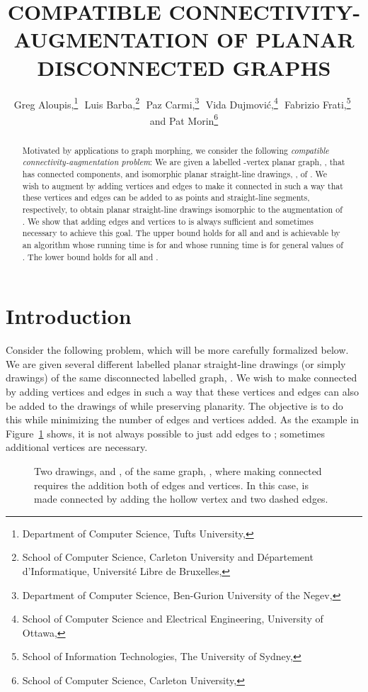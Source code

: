\documentclass[11pt]{patmorin}
\title{\MakeUppercase{Compatible Connectivity-Augmentation \newline of Planar Disconnected Graphs}}
\author{Greg Aloupis,\thanks{Department of Computer Science, Tufts University, 
                             \email{aloupis.greg@gmail.com}}\,\,
       Luis Barba,\thanks{School of Computer Science, Carleton University
                          and Département d'Informatique, 
                          Université Libre de Bruxelles,
                          \email{lbarbafl@ulb.ac.be}}\,\,
       Paz Carmi,\thanks{Department of Computer Science,
                         Ben-Gurion University of the Negev,
                         \email{carmip@cs.bgu.ac.il}}\,\,
       Vida Dujmović,\thanks{School of Computer Science 
                             and Electrical Engineering,
                             University of Ottawa,
                             \email{vida.dujmovic@uottawa.ca}}\,\,
       Fabrizio Frati,\thanks{School of Information Technologies,
                              The University of Sydney,
                              \email{fabrizio.frati@sydney.edu.au}}\,\,
       and Pat Morin\thanks{School of Computer Science, Carleton University,
                            \email{morin@scs.carleton.ca}}}
\begin{document}
\begin{titlepage}

\maketitle
\begin{abstract}
Motivated by applications to graph morphing, we consider the following
\emph{compatible connectivity-augmentation problem}: We are given
a labelled -vertex planar graph, , that has 
connected components, and  isomorphic planar straight-line drawings,
, of . We wish to augment 
by adding  vertices and edges to make it connected in such a way that
these vertices and edges can be added to  as points and
straight-line segments, respectively, to obtain  planar straight-line
drawings isomorphic to the augmentation of .  We show
that adding  edges and vertices to 
is always sufficient and sometimes necessary to achieve this goal.
The upper bound holds for all  and  and is
achievable by an algorithm whose running time is  for
 and whose running time is  for general values of .
The lower bound holds for all  and .
\end{abstract}

\end{titlepage}



\section{Introduction}


Consider the following problem, which will be more carefully formalized
below.  We are given several different labelled planar straight-line drawings
(or simply drawings) of the same disconnected labelled graph, .
We wish to make  connected by adding vertices and edges in
such a way that these vertices and edges can also be added to the 
drawings of  while preserving planarity.  
The objective is to do this while minimizing the number
of edges and vertices added.  As the example in Figure~\ref{fig:bad-example} shows, it is not always possible to just add edges to ; sometimes additional vertices are necessary.

\begin{figure}[hb]
  \caption{Two drawings,  and , of the same graph, , where making  connected requires the addition both of edges and vertices. In this case,  is made connected by adding the hollow vertex and two dashed edges.}
  \label{fig:bad-example}
\end{figure}
\end{document}
